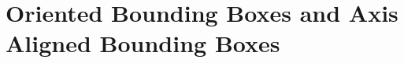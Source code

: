 \section{Oriented Bounding Boxes and Axis Aligned Bounding Boxes}
\begin{figure}[h]
    \centering
    

\end{figure}
